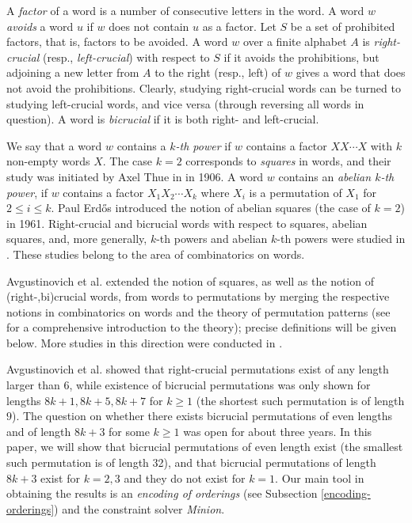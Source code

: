 \documentclass[12pt,reqno]{article}
\begin{document}
A {\em factor} of a word is a number of consecutive letters in the word. A word $w$ {\em avoids} a word $u$ if $w$ does not contain $u$ as a factor.  Let $S$ be a set of prohibited factors, that is, factors to be avoided. A word $w$ over a finite alphabet $A$ is {\em right-crucial} (resp., {\em left-crucial}) with respect to $S$ if it avoids the prohibitions, but adjoining a new letter from $A$ to the right (resp., left) of $w$ gives a word that does not avoid the prohibitions. Clearly, studying right-crucial words can be turned to studying left-crucial words, and vice versa (through reversing all words in question). A word is {\em bicrucial} if it is both right- and left-crucial. 

We say that a word $w$ contains a {\em $k$-th
power} if $w$ contains a factor $XX\cdots X$ with $k$ non-empty
words $X$. The case $k=2$ corresponds to {\em squares} in words, and their study was initiated by Axel Thue in \cite{thue} in 1906. A word $w$ contains an {\em abelian $k$-th power},
if $w$ contains a factor $X_1X_2\cdots X_k$ where $X_i$ is a
permutation of $X_1$ for $2\leq i\leq k$. Paul Erd\H{o}s \cite{pE61some} introduced the notion of abelian squares (the case of $k=2$) in 1961. Right-crucial and bicrucial words with respect to squares, abelian squares, and, more generally, $k$-th powers and abelian $k$-th powers were studied in \cite{AGHK,B, C, EK,GHK, K}. These studies belong to the area of combinatorics on words. 

Avgustinovich et al. \cite{AKPV} extended the notion of squares, as well as the notion of (right-,bi)crucial words, from words to permutations by merging the respective notions in combinatorics on words and the theory of permutation patterns (see \cite{Kit} for a comprehensive introduction to the theory); precise definitions will be given below. More studies in this direction were conducted in \cite{AKV}. 

Avgustinovich et al. \cite{AKPV} showed that right-crucial permutations exist of any length larger than $6$, while existence of bicrucial permutations was only shown for lengths $8k+1, 8k+5, 8k+7$ for $k\ge 1$ (the shortest such permutation is of length $9$). The question on whether there exists bicrucial permutations of even lengths and of length $8k+3$ for some $k\geq 1$ was open for about three years. In this paper, we will show that bicrucial permutations of even length exist (the smallest such permutation is of length 32), and that bicrucial permutations of length $8k+3$ exist for $k=2,3$ and they do not exist for $k=1$. Our main tool in obtaining the results is an {\em encoding of orderings} (see Subsection \ref{encoding-orderings}) and the constraint solver {\em Minion}.
\end{document}
